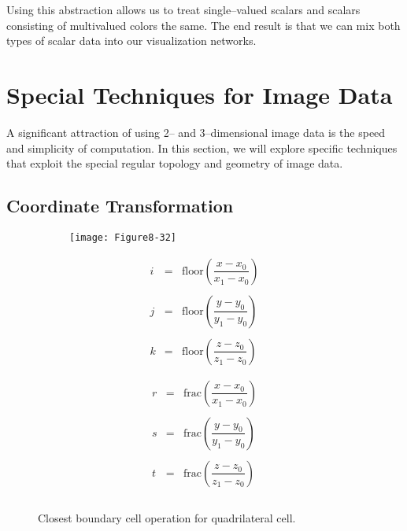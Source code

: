 Using this abstraction allows us to treat single--valued scalars and scalars consisting of multivalued colors the same. The end result is that we can mix both types of scalar data into our visualization networks.

\section{Special Techniques for Image Data}
\label{sec:special_techniques_for_image_data}

A significant attraction of using 2-- and 3--dimensional image data is the speed and simplicity of computation. In this section, we will explore specific techniques that exploit the special regular topology and geometry of image data.

\subsection{Coordinate Transformation}

\begin{figure}[!htb]
    \centering
    \begin{subfigure}{0.48\linewidth}
        \centering
        \texttt{[image: Figure8-32]}
        \caption*{}\label{fig:Figure8-32a}
    \end{subfigure}
    \hfill
    \begin{subfigure}{0.48\linewidth}
    \begin{equation*}
        \begin{array}{lll}
        i &=& \text{floor}(\dfrac{x - x_0}{x_1 - x_0}) \\ \\
        j &=& \text{floor}(\dfrac{y - y_0}{y_1 - y_0}) \\ \\
        k &=& \text{floor}(\dfrac{z - z_0}{z_1 - z_0}) \\ \\
    \end{array}
    \end{equation*}
    \begin{equation*}
        \begin{array}{lll}
        r &=& \text{frac}(\dfrac{x - x_0}{x_1 - x_0}) \\ \\
        s &=& \text{frac}(\dfrac{y - y_0}{y_1 - y_0}) \\ \\
        t &=& \text{frac}(\dfrac{z - z_0}{z_1 - z_0}) \\ \\
    \end{array}
    \end{equation*}
    \end{subfigure}%
    \caption{Closest boundary cell operation for quadrilateral cell.}
    \label{fig:Figure8-32}
\end{figure}


